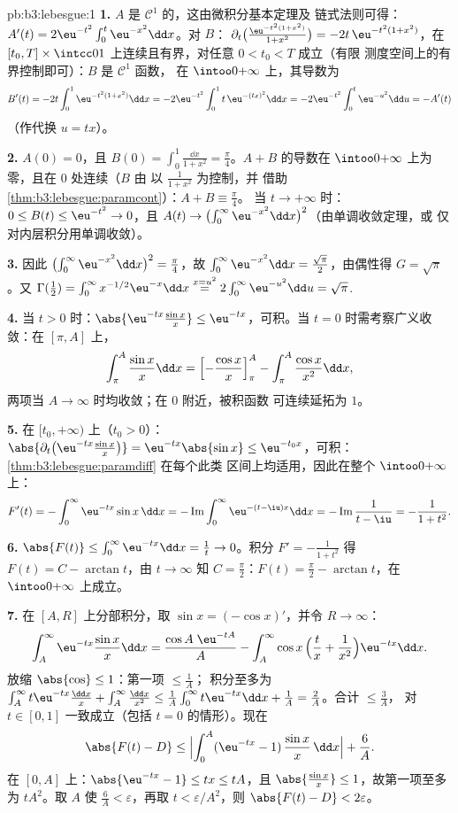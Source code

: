 \begin{solution}{pb:b3:lebesgue:1}
\textbf{1.} $A$ 是 $\mathcal C^1$ 的，这由微积分基本定理及
链式法则可得：$A'(t) =
2\eu^{-t^2}\int_0^t\eu^{-x^2}\dd x$。对 $B$：
$\partial_t\bigl(\frac{\eu^{-t^2(1+x^2)}}{1+x^2}\bigr) =
-2t\,\eu^{-t^2(1+x^2)}$，在 $[t_0, T]
\times \intcc01$ 上连续且有界，对任意 $0 < t_0 < T$ 成立（有限
测度空间上的有界控制即可）：$B$ 是 $\mathcal C^1$ 函数，
在 $\intoo0{+\infty}$ 上，其导数为
\[
B'(t) = -2t\int_0^1 \eu^{-t^2(1+x^2)}\dd x
= -2\eu^{-t^2}\int_0^1 t\,\eu^{-(tx)^2}\dd x
= -2\eu^{-t^2}\int_0^t\eu^{-u^2}\dd u = -A'(t)
\]
（作代换 $u = tx$）。

\textbf{2.} $A(0) = 0$，且 $B(0) = \int_0^1\frac{\dd x}{1+x^2}
= \frac\pi4$。$A + B$ 的导数在
$\intoo0{+\infty}$ 上为零，且在 $0$ 处连续（$B$ 由
以 $\frac1{1+x^2}$ 为控制，并
借助\cref{thm:b3:lebesgue:paramcont}）：$A + B \equiv \frac\pi4$。
当 $t\to+\infty$ 时：$0 \leq B(t) \leq \eu^{-t^2} \to 0$，且
$A(t) \to \bigl(\int_0^\infty\eu^{-x^2}\dd x\bigr)^2$（由单调收敛定理，或
仅对内层积分用单调收敛）。

\textbf{3.} 因此 $\bigl(\int_0^\infty\eu^{-x^2}\dd x\bigr)^2
= \frac\pi4$，故 $\int_0^\infty\eu^{-x^2}\dd x =
\frac{\sqrt\pi}2$，由偶性得 $G = \sqrt\pi$。又
$\Gamma(\frac12) = \int_0^\infty x^{-1/2}\eu^{-x}\dd x
\overset{x = u^2}{=} 2\int_0^\infty\eu^{-u^2}\dd u =
\sqrt\pi$.

\textbf{4.} 当 $t > 0$ 时：$\abs{\eu^{-tx}\frac{\sin x}x} \leq
\eu^{-tx}$，可积。当 $t = 0$ 时需考察广义收敛：在
$[\pi, A]$ 上，
\[
\int_\pi^A\frac{\sin x}x\dd x
= \Bigl[-\frac{\cos x}x\Bigr]_\pi^A -
\int_\pi^A\frac{\cos x}{x^2}\dd x,
\]
两项当 $A \to \infty$ 时均收敛；在 $0$ 附近，被积函数
可连续延拓为 $1$。

\textbf{5.} 在 $[t_0, +\infty)$ 上（$t_0 > 0$）：
$\abs{\partial_t\bigl(\eu^{-tx}\tfrac{\sin x}x\bigr)} =
\eu^{-tx}\abs{\sin x} \leq \eu^{-t_0x}$，可积：
\cref{thm:b3:lebesgue:paramdiff} 在每个此类
区间上均适用，因此在整个 $\intoo0{+\infty}$ 上：
\[
F'(t) = -\int_0^\infty\eu^{-tx}\sin x\,\dd x
= -\operatorname{Im}\int_0^\infty\eu^{-(t - \iu)x}\dd x
= -\operatorname{Im}\frac{1}{t - \iu} = -\frac{1}{1 + t^2}.
\]

\textbf{6.} $\abs{F(t)} \leq \int_0^\infty\eu^{-tx}\dd x =
\frac1t \to 0$。积分 $F' = -\frac1{1+t^2}$ 得 $F(t) = C -
\arctan t$，由 $t \to \infty$ 知 $C = \frac\pi2$：$F(t) =
\frac\pi2 - \arctan t$，在 $\intoo0{+\infty}$ 上成立。

\textbf{7.} 在 $[A, R]$ 上分部积分，取 $\sin x =
(-\cos x)'$，并令 $R \to \infty$：
\[
\int_A^{\infty}\eu^{-tx}\frac{\sin x}x\dd x
= \frac{\cos A\;\eu^{-tA}}{A}
- \int_A^\infty \cos x\,\Bigl(\frac tx +
\frac1{x^2}\Bigr)\eu^{-tx}\dd x .
\]
放缩 $\abs{\cos} \leq 1$：第一项 $\leq \frac1A$；
积分至多为 $\int_A^\infty t\eu^{-tx}\frac{\dd x}x
+ \int_A^\infty\frac{\dd x}{x^2} \leq \frac1A\int_0^\infty
t\eu^{-tx}\dd x + \frac1A = \frac2A$。合计 $\leq \frac 3A$，
对 $t \in [0, 1]$ 一致成立（包括 $t = 0$ 的情形）。现在
\[
\abs{F(t) - D} \leq
\Bigl|\int_0^A(\eu^{-tx} - 1)\,\frac{\sin x}x\,\dd x\Bigr| +
\frac6A .
\]
在 $[0, A]$ 上：$\abs{\eu^{-tx} - 1} \leq tx \leq tA$，且
$\abs{\frac{\sin x}x} \leq 1$，故第一项至多为
$tA^2$。取 $A$ 使 $\frac6A < \varepsilon$，再取 $t <
\varepsilon/A^2$，则 $\abs{F(t) - D} < 2\varepsilon$。


\end{solution}
